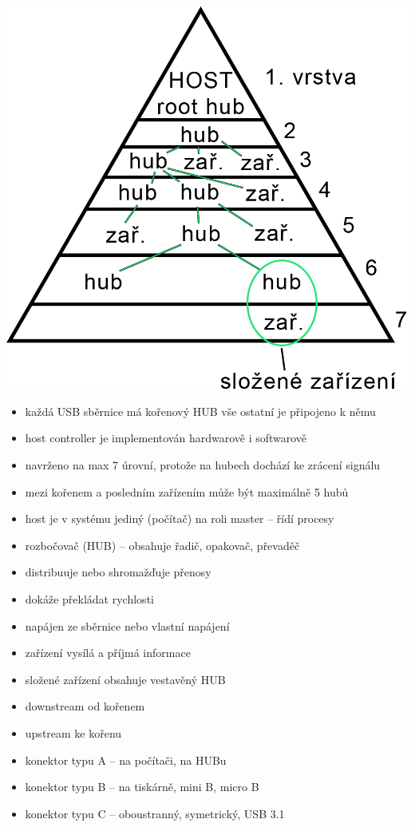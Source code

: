 \documentclass[a4paper,12pt]{article}
\providecommand{\tightlist}{%
\setlength{\itemsep}{0pt}\setlength{\parskip}{0pt}}
\begin{document}
\includegraphics{ref/usb-structure.png}

\begin{itemize}
  \tightlist
  \item každá USB sběrnice má kořenový HUB vše ostatní je připojeno k němu 
  \item host controller je implementován hardwarově i softwarově
  \item navrženo na max 7 úrovní, protože na hubech dochází ke zrácení signálu
  \item mezi kořenem a posledním zařízením může být maximálně 5 hubů
  \item host je v systému jediný (počítač) na roli master -- řídí procesy
  \item rozbočovač (HUB) -- obsahuje řadič, opakovač, převaděč
  \item distribuuje nebo shromažďuje přenosy
  \item dokáže překládat rychlosti
  \item napájen ze sběrnice nebo vlastní napájení
  \item zařízení vysílá a příjmá informace 
  \item složené zařízení obsahuje vestavěný HUB
  \item downstream od kořenem
  \item upstream ke kořenu
  \item konektor typu A -- na počítači, na HUBu
  \item konektor typu B -- na tiskárně, mini B, micro B
  \item konektor typu C -- oboustranný, symetrický, USB 3.1
\end{itemize}
\end{document}
